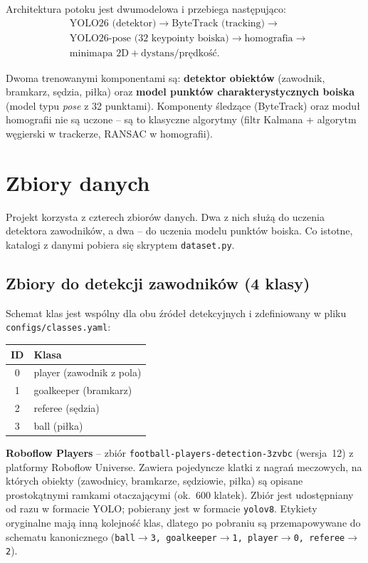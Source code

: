 \documentclass[11pt,a4paper]{article}
\begin{document}
Architektura potoku jest dwumodelowa i przebiega następująco:
\[
\begin{aligned}
  &\text{YOLO26 (detektor)} \rightarrow \text{ByteTrack (tracking)} \rightarrow \\
  &\text{YOLO26-pose (32 keypointy boiska)} \rightarrow \text{homografia} \rightarrow \\
  &\text{minimapa 2D} + \text{dystans/prędkość}.
\end{aligned}
\]

Dwoma trenowanymi komponentami są: \textbf{detektor obiektów} (zawodnik,
bramkarz, sędzia, piłka) oraz \textbf{model punktów charakterystycznych boiska}
(model typu \emph{pose} z 32 punktami). Komponenty śledzące (ByteTrack) oraz
moduł homografii nie są uczone -- są to klasyczne algorytmy (filtr Kalmana +
algorytm węgierski w trackerze, RANSAC w homografii).

\section{Zbiory danych}
\label{sec:dane}

Projekt korzysta z czterech zbiorów danych. Dwa z nich służą do uczenia
detektora zawodników, a dwa -- do uczenia modelu punktów boiska. Co istotne,
katalogi z danymi pobiera się skryptem \texttt{dataset.py}.

\subsection{Zbiory do detekcji zawodników (4 klasy)}

Schemat klas jest wspólny dla obu źródeł detekcyjnych i zdefiniowany w pliku
\texttt{configs/classes.yaml}:

\begin{center}
\begin{tabular}{cl}
\toprule
ID & Klasa \\
\midrule
0 & player (zawodnik z pola) \\
1 & goalkeeper (bramkarz) \\
2 & referee (sędzia) \\
3 & ball (piłka) \\
\bottomrule
\end{tabular}
\end{center}

\textbf{Roboflow Players} -- zbiór \texttt{football-players-detection-3zvbc}
(wersja~12) z platformy Roboflow Universe. Zawiera pojedyncze klatki z nagrań
meczowych, na których obiekty (zawodnicy, bramkarze, sędziowie, piłka) są
opisane prostokątnymi ramkami otaczającymi (ok.~600
klatek). Zbiór jest udostępniany od razu w formacie YOLO; pobierany jest w
formacie \texttt{yolov8}. Etykiety oryginalne mają inną kolejność klas, dlatego
po pobraniu są przemapowywane do schematu kanonicznego
(\texttt{ball$\rightarrow$3, goalkeeper$\rightarrow$1, player$\rightarrow$0,
referee$\rightarrow$2}).
\end{document}
